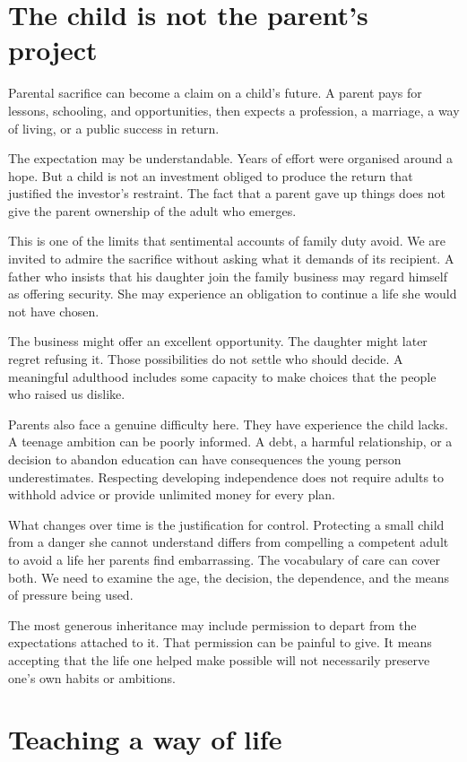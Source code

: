 \documentclass[12pt,a4paper]{book}
\begin{document}
\section*{The child is not the parent's project}

Parental sacrifice can become a claim on a child's future. A parent pays for lessons, schooling, and opportunities, then expects a profession, a marriage, a way of living, or a public success in return.

The expectation may be understandable. Years of effort were organised around a hope. But a child is not an investment obliged to produce the return that justified the investor's restraint. The fact that a parent gave up things does not give the parent ownership of the adult who emerges.

This is one of the limits that sentimental accounts of family duty avoid. We are invited to admire the sacrifice without asking what it demands of its recipient. A father who insists that his daughter join the family business may regard himself as offering security. She may experience an obligation to continue a life she would not have chosen.

The business might offer an excellent opportunity. The daughter might later regret refusing it. Those possibilities do not settle who should decide. A meaningful adulthood includes some capacity to make choices that the people who raised us dislike.

Parents also face a genuine difficulty here. They have experience the child lacks. A teenage ambition can be poorly informed. A debt, a harmful relationship, or a decision to abandon education can have consequences the young person underestimates. Respecting developing independence does not require adults to withhold advice or provide unlimited money for every plan.

What changes over time is the justification for control. Protecting a small child from a danger she cannot understand differs from compelling a competent adult to avoid a life her parents find embarrassing. The vocabulary of care can cover both. We need to examine the age, the decision, the dependence, and the means of pressure being used.

The most generous inheritance may include permission to depart from the expectations attached to it. That permission can be painful to give. It means accepting that the life one helped make possible will not necessarily preserve one's own habits or ambitions.

\section*{Teaching a way of life}
\end{document}
